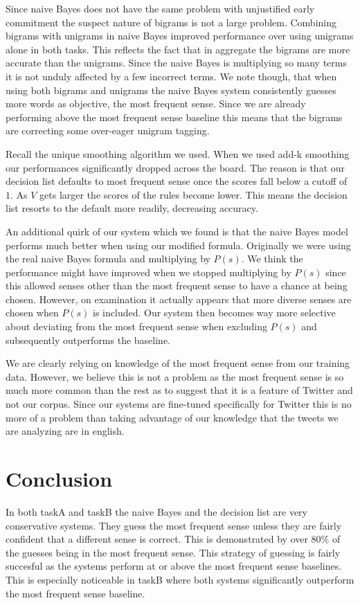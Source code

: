 \documentclass[11pt]{article}
\begin{document}
Since naive Bayes does not have the same problem with unjustified early commitment the suspect nature of bigrams is not a large problem. Combining bigrams with unigrams in naive Bayes improved performance over using unigrams alone in both tasks. This reflects the fact that in aggregate the bigrams are more accurate than the unigrams. Since the naive Bayes is multiplying so many terms it is not unduly affected by a few incorrect terms. We note though, that when using both bigrams and unigrams the naive Bayes system consistently guesses more words as objective, the most frequent sense. Since we are already performing above the most frequent sense baseline this means that the bigrams are correcting some over-eager unigram tagging. 

Recall the unique smoothing algorithm we used. When we used add-k smoothing our performances significantly dropped across the board. The reason is that our decision list defaults to most frequent sense once the scores fall below a cutoff of $1$. As $V$ gets larger the scores of the rules become lower. This means the decision list resorts to the default more readily, decreasing accuracy. 

An additional quirk of our system which we found is that the naive Bayes model performs much better when using our modified formula. Originally we were using the real naive Bayes formula and multiplying by $P(s)$. We think the performance might have improved when we stopped multiplying by $P(s)$ since this allowed senses other than the most frequent sense to have a chance at being chosen. However, on examination it actually appears that more diverse senses are chosen when $P(s)$ is included. Our system then becomes way more selective about deviating from the most frequent sense when excluding $P(s)$ and subsequently outperforms the baseline.

We are clearly relying on knowledge of the most frequent sense from our training data. However, we believe this is not a problem as the most frequent sense is so much more common than the rest as to suggest that it is a feature of Twitter and not our corpus. Since our systems are fine-tuned specifically for Twitter this is no more of a problem than taking advantage of our knowledge that the tweets we are analyzing are in english.


\section{Conclusion}
In both taskA and taskB the naive Bayes and the decision list are very conservative systems. They guess the most frequent sense unless they are fairly confident that a different sense is correct. This is demonstrated by over $80\%$ of the guesses being in the most frequent sense. This strategy of guessing is fairly succesful as the systems perform at or above the most frequent sense baselines. This is especially noticeable in taskB where both systems significantly outperform the most frequent sense baseline. 
\end{document}
